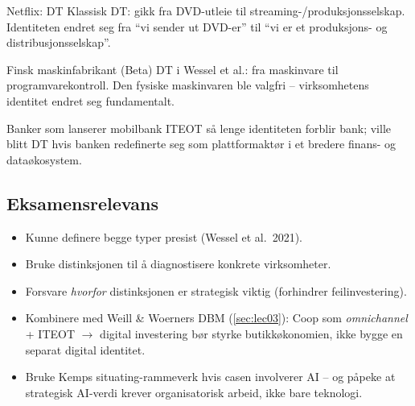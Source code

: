 \begin{eksempelboks}{Netflix: DT}
Klassisk DT: gikk fra DVD-utleie til streaming-/produksjonsselskap.
Identiteten endret seg fra ``vi sender ut DVD-er'' til ``vi er et
produksjons- og distribusjonsselskap''.
\end{eksempelboks}

\begin{eksempelboks}{Finsk maskinfabrikant (Beta)}
DT i Wessel et al.: fra maskinvare til programvarekontroll. Den fysiske
maskinvaren ble valgfri -- virksomhetens identitet endret seg fundamentalt.
\end{eksempelboks}

\begin{eksempelboks}{Banker som lanserer mobilbank}
ITEOT så lenge identiteten forblir \guillemotleft{}bank\guillemotright{}; ville blitt DT hvis banken
redefinerte seg som plattformaktør i et bredere finans- og dataøkosystem.
\end{eksempelboks}

\subsection{Eksamensrelevans}
\begin{itemize}
  \item Kunne definere begge typer presist (Wessel et al.\ 2021).
  \item Bruke distinksjonen til å diagnostisere konkrete virksomheter.
  \item Forsvare \emph{hvorfor} distinksjonen er strategisk viktig (forhindrer
    feilinvestering).
  \item Kombinere med Weill \& Woerners DBM (\autoref{sec:lec03}): Coop som
    \emph{omnichannel} + ITEOT $\rightarrow$ digital investering bør styrke
    butikkøkonomien, ikke bygge en separat digital identitet.
  \item Bruke Kemps situating-rammeverk hvis casen involverer AI -- og
    påpeke at strategisk AI-verdi krever organisatorisk arbeid, ikke bare
    teknologi.
\end{itemize}
